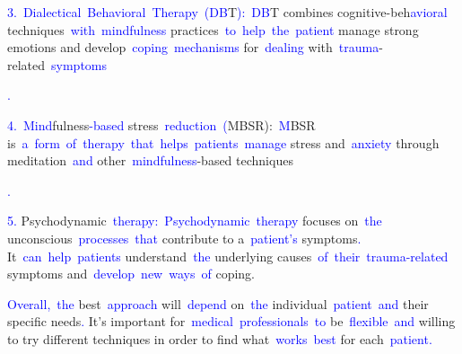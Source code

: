 \documentclass{article}
\begin{document}
\begin{tcolorbox}[colframe=black,colback=white]
{}\textcolor{blue}{3}\textcolor{blue}{.}\textcolor{blue}{~D}\textcolor{blue}{ialect}\textcolor{blue}{ical}\textcolor{blue}{~Behavioral}\textcolor{blue}{~Therapy}\textcolor{blue}{~(}\textcolor{blue}{DB}T\textcolor{blue}{):}\textcolor{blue}{~DB}T combines cognitive-beh\textcolor{blue}{avior}\textcolor{blue}{al} techniques\textcolor{blue}{~with}\textcolor{blue}{~mindfulness} practices\textcolor{blue}{~to}\textcolor{blue}{~help}\textcolor{blue}{~the}\textcolor{blue}{~patient} manage strong emotions and develop\textcolor{blue}{~coping}\textcolor{blue}{~mechanisms} for\textcolor{blue}{~dealing} with\textcolor{blue}{~trauma}-related\textcolor{blue}{~symptoms}\textcolor{blue}{.

}\textcolor{blue}{4}\textcolor{blue}{.}\textcolor{blue}{~Mind}fulness\textcolor{blue}{-based} stress\textcolor{blue}{~reduction}\textcolor{blue}{~(}MBSR):\textcolor{blue}{~M}BSR is\textcolor{blue}{~a}\textcolor{blue}{~form}\textcolor{blue}{~of}\textcolor{blue}{~therapy}\textcolor{blue}{~that}\textcolor{blue}{~helps}\textcolor{blue}{~patients}\textcolor{blue}{~manage} stress and\textcolor{blue}{~anxiety} through meditation\textcolor{blue}{~and} other\textcolor{blue}{~mindfulness}-based techniques\textcolor{blue}{.

}\textcolor{blue}{5}\textcolor{blue}{.} Psychodynamic\textcolor{blue}{~therapy}\textcolor{blue}{:}\textcolor{blue}{~Psych}\textcolor{blue}{odynamic}\textcolor{blue}{~therapy} focuses on\textcolor{blue}{~the} unconscious\textcolor{blue}{~processes}\textcolor{blue}{~that} contribute to a\textcolor{blue}{~patient}\textcolor{blue}{'s} symptoms\textcolor{blue}{.} It\textcolor{blue}{~can}\textcolor{blue}{~help}\textcolor{blue}{~patients} understand\textcolor{blue}{~the} underlying causes\textcolor{blue}{~of}\textcolor{blue}{~their}\textcolor{blue}{~trauma}\textcolor{blue}{-related} symptoms and\textcolor{blue}{~develop}\textcolor{blue}{~new}\textcolor{blue}{~ways}\textcolor{blue}{~of} coping.

\textcolor{blue}{Overall}\textcolor{blue}{,}\textcolor{blue}{~the} best\textcolor{blue}{~approach} will\textcolor{blue}{~depend} on\textcolor{blue}{~the} individual\textcolor{blue}{~patient}\textcolor{blue}{~and} their specific needs\textcolor{blue}{.} It's important for\textcolor{blue}{~medical}\textcolor{blue}{~professionals}\textcolor{blue}{~to} be\textcolor{blue}{~flexible}\textcolor{blue}{~and} willing to try different techniques in order to find what\textcolor{blue}{~works}\textcolor{blue}{~best} for each\textcolor{blue}{~patient}\textcolor{blue}{.}\textcolor{blue}{}
\end{tcolorbox}
\end{document}
